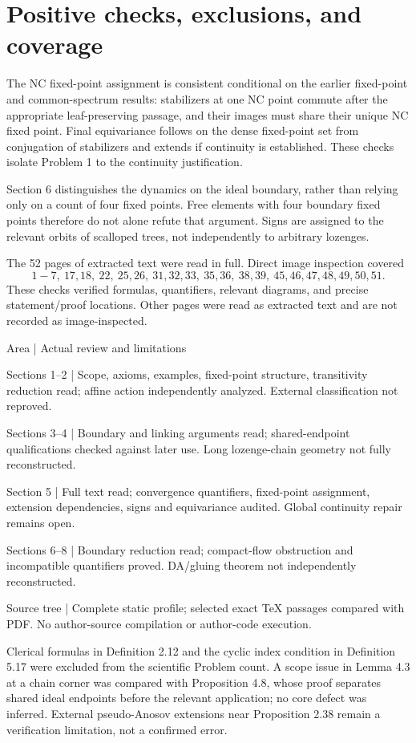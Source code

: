\documentclass[10pt]{article}
\begin{document}
\section*{Positive checks, exclusions, and coverage}
The NC fixed-point assignment is consistent conditional on the earlier fixed-point and common-spectrum results: stabilizers at one NC point commute after the appropriate leaf-preserving passage, and their images must share their unique NC fixed point. Final equivariance follows on the dense fixed-point set from conjugation of stabilizers and extends if continuity is established. These checks isolate Problem 1 to the continuity justification.\par
Section 6 distinguishes the dynamics on the ideal boundary, rather than relying only on a count of four fixed points. Free elements with four boundary fixed points therefore do not alone refute that argument. Signs are assigned to the relevant orbits of scalloped trees, not independently to arbitrary lozenges.\par
The 52 pages of extracted text were read in full. Direct image inspection covered \[1\!-\!7,\ 17,18,\ 22,\ 25,26,\ 31,32,33,\ 35,36,\ 38,39,\
45,46,47,48,49,50,51.\] These checks verified formulas, quantifiers, relevant diagrams, and precise statement/proof locations. Other pages were read as extracted text and are not recorded as image-inspected.\par
Area | Actual review and limitations\par
Sections 1–2 | Scope, axioms, examples, fixed-point structure, transitivity reduction read; affine action independently analyzed. External classification not reproved.\par
Sections 3–4 | Boundary and linking arguments read; shared-endpoint qualifications checked against later use. Long lozenge-chain geometry not fully reconstructed.\par
Section 5 | Full text read; convergence quantifiers, fixed-point assignment, extension dependencies, signs and equivariance audited. Global continuity repair remains open.\par
Sections 6–8 | Boundary reduction read; compact-flow obstruction and incompatible quantifiers proved. DA/gluing theorem not independently reconstructed.\par
Source tree | Complete static profile; selected exact TeX passages compared with PDF. No author-source compilation or author-code execution.\par
Clerical formulas in Definition 2.12 and the cyclic index condition in Definition 5.17 were excluded from the scientific Problem count. A scope issue in Lemma 4.3 at a chain corner was compared with Proposition 4.8, whose proof separates shared ideal endpoints before the relevant application; no core defect was inferred. External pseudo-Anosov extensions near Proposition 2.38 remain a verification limitation, not a confirmed error.\par
\end{document}
